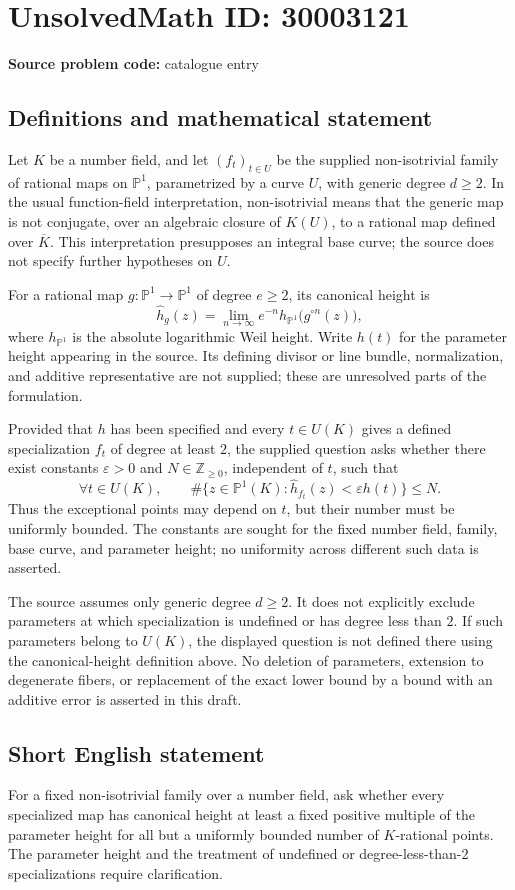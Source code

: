 \documentclass[11pt]{article}
\newcommand{\Z}{\mathbb{Z}}
\newcommand{\PP}{\mathbb{P}}
\begin{document}
\section*{UnsolvedMath ID: 30003121}
\textbf{Source problem code:} catalogue entry
\subsection{Definitions and mathematical statement}
Let \(K\) be a number field, and let \((f_t)_{t\in U}\) be the supplied non-isotrivial family of rational maps on \(\PP^1\), parametrized by a curve \(U\), with generic degree \(d\geq 2\). In the usual function-field interpretation, non-isotrivial means that the generic map is not conjugate, over an algebraic closure of \(K(U)\), to a rational map defined over \(\overline K\). This interpretation presupposes an integral base curve; the source does not specify further hypotheses on \(U\).

For a rational map \(g:\PP^1\to\PP^1\) of degree \(e\geq2\), its canonical height is
\[
\widehat h_g(z)=\lim_{n\to\infty}e^{-n}h_{\PP^1}\bigl(g^{\circ n}(z)\bigr),
\]
where \(h_{\PP^1}\) is the absolute logarithmic Weil height. Write \(h(t)\) for the parameter height appearing in the source. Its defining divisor or line bundle, normalization, and additive representative are not supplied; these are unresolved parts of the formulation.

Provided that \(h\) has been specified and every \(t\in U(K)\) gives a defined specialization \(f_t\) of degree at least \(2\), the supplied question asks whether there exist constants \(\varepsilon>0\) and \(N\in\Z_{\geq0}\), independent of \(t\), such that
\[
\forall t\in U(K),\qquad
\#\bigl\{z\in\PP^1(K):\widehat h_{f_t}(z)<\varepsilon h(t)\bigr\}\leq N.
\]
Thus the exceptional points may depend on \(t\), but their number must be uniformly bounded. The constants are sought for the fixed number field, family, base curve, and parameter height; no uniformity across different such data is asserted.

The source assumes only generic degree \(d\geq2\). It does not explicitly exclude parameters at which specialization is undefined or has degree less than \(2\). If such parameters belong to \(U(K)\), the displayed question is not defined there using the canonical-height definition above. No deletion of parameters, extension to degenerate fibers, or replacement of the exact lower bound by a bound with an additive error is asserted in this draft.
\subsection{Short English statement}
For a fixed non-isotrivial family over a number field, ask whether every specialized map has canonical height at least a fixed positive multiple of the parameter height for all but a uniformly bounded number of \(K\)-rational points. The parameter height and the treatment of undefined or degree-less-than-\(2\) specializations require clarification.
\end{document}
